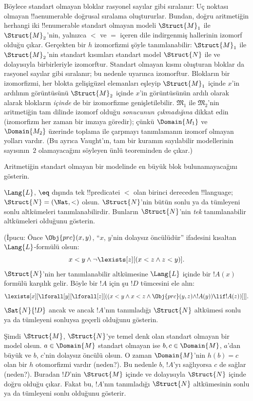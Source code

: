 \documentclass[../../../include/open-logic-section]{subfiles}
\begin{document}
Böylece standart olmayan bloklar rasyonel sayılar gibi sıralanır: Uç noktası
olmayan !!a{enumerable} doğrusal sıralama oluştururlar. Bundan, doğru
aritmetiğin herhangi iki !!{enumerable} standart olmayan modeli
$\Struct{M}_1$ ile $\Struct{M}_2$'nin, yalnızca $<$ ve $=$ içeren dile
indirgenmiş hallerinin izomorf olduğu çıkar. Gerçekten bir $h$ izomorfizmi
şöyle tanımlanabilir: $\Struct{M}_1$ ile $\Struct{M}_2$'nin standart kısımları
standart model $\Struct{N}$ ile ve dolayısıyla birbirleriyle izomorftur.
Standart olmayan kısmı oluşturan bloklar da rasyonel sayılar gibi sıralanır;
bu nedenle  uyarınca izomorftur. Blokların bir
izomorfizmi, her blokta gelişigüzel elemanları eşleyip $\Struct{M}_1$ içinde
$x$'in ardılının görüntüsünü $\Struct{M}_2$ içinde $x$'in görüntüsünün ardılı
olarak alarak blokların \emph{içinde} de bir izomorfizme genişletilebilir.
$\mathfrak{M}_1$ ile $\mathfrak{M}_2$'nin aritmetiğin tam dilinde izomorf
olduğu \emph{sonucunun çıkmadığına} dikkat edin (izomorfizm her zaman bir
imzaya göredir); çünkü $\Domain{M_1}$ ve $\Domain{M_2}$ üzerinde toplama ile
çarpmayı tanımlamanın izomorf olmayan yolları vardır. (Bu ayrıca Vaught'ın,
tam bir kuramın sayılabilir modellerinin sayısının~$2$ olamayacağını söyleyen
ünlü teoreminden de çıkar.)

\begin{prob}
Aritmetiğin standart olmayan bir modelinde en büyük blok bulunamayacağını
gösterin.
\end{prob}

\begin{prob}
$\Lang{L}$, $\eq$ dışında tek !!{predicate}{}i $<$ olan birinci dereceden
!!{language}; $\Struct{N} = (\Nat,<)$ olsun. $\Struct{N}$'nin bütün sonlu ya
da tümleyeni sonlu altkümeleri tanımlanabilirdir. Bunların $\Struct{N}$'nin
\emph{tek} tanımlanabilir altkümeleri olduğunu gösterin.

(İpucu: Önce $\Obj{prc}(x,y)$, ``$x$, $y$'nin dolaysız öncülüdür'' ifadesini
kısaltan $\Lang{L}$-formülü olsun:
\[
x<y \land \lnot \lexists[z][(x<z \land z < y)].
\]
$\Struct{N}$'nin her tanımlanabilir altkümesine $\Lang{L}$ içinde bir
$!A(x)$ formülü karşılık gelir. Böyle bir $!A$ için şu $!D$ tümcesini ele alın:
\[
\lexists[x][\lforall[y][\lforall[z][((x<y \land x<z \land \Obj{prc}(y,z)
  \land !A(y)) \lif !A(z))]]].
\]
$\Sat{N}{!D}$ ancak ve ancak $!A$'nın tanımladığı $\Struct{N}$ altkümesi
sonlu ya da tümleyeni sonluysa geçerli olduğunu gösterin.

Şimdi $\Struct{M}$, $\Struct{N}$'ye temel denk olan standart olmayan bir
model olsun. $a \in \Domain{M}$ standart olmayan ise $b,c \in \Domain{M}$,
$a$'dan büyük ve $b$, $c$'nin dolaysız öncülü olsun. O zaman
$\Domain{M}$'nin $h(b)=c$ olan bir $h$ otomorfizmi vardır (neden?). Bu nedenle
$b$, $!A$'yı sağlıyorsa $c$ de sağlar (neden?). Buradan $!D$'nin
$\Struct{M}$ içinde ve dolayısıyla $\Struct{N}$ içinde doğru olduğu çıkar.
Fakat bu, $!A$'nın tanımladığı $\Struct{N}$ altkümesinin sonlu ya da tümleyeni
sonlu olduğunu gösterir.
\end{prob}
\end{document}
